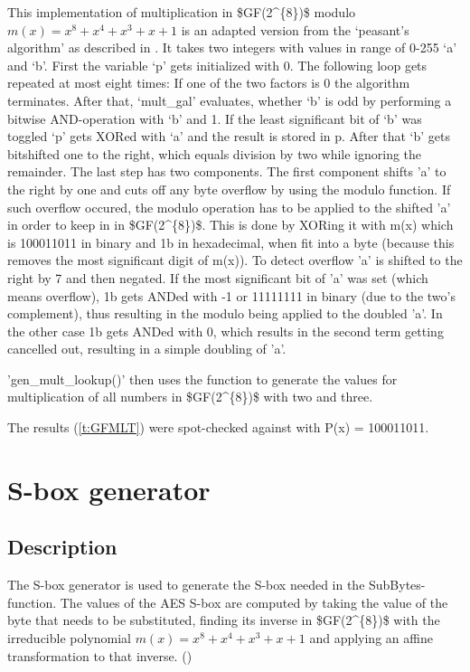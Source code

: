This implementation of multiplication in \ac{$GF(2^{8})$} modulo $m(x) = x^8 + x^4 +
x^3 + x + 1$ is an adapted version from the `peasant's algorithm' as
described in
\cite{peasants}.
It takes two integers with values in range of 0-255 `a' and `b'. First
the variable `p' gets initialized with 0. The following loop gets
repeated at most eight times: If one of the two factors is 0 the
algorithm terminates. After that, `mult\_gal' evaluates, whether `b' is
odd by performing a bitwise \ac{AND}-operation with `b' and 1. If the least
significant bit of `b' was toggled `p' gets \ac{XOR}ed with `a' and the
result is stored in p. After that `b' gets bitshifted one to the right,
which equals division by two while ignoring the remainder. The last step
has two components.
The first component shifts 'a' to the right by one and cuts off any byte overflow
by using the modulo function. If such overflow occured, the modulo operation has to be
applied to the shifted 'a' in order to keep in in \ac{$GF(2^{8})$}. This is done by \ac{XOR}ing it
with m(x) which is 100011011 in binary and 1b in hexadecimal, when fit into a byte (because
this removes the most significant digit of m(x)). To detect overflow 'a' is shifted to the right by 7
and then negated. If the most significant bit of 'a' was set (which means overflow), 1b gets \ac{AND}ed
with -1 or 11111111 in binary (due to the two's complement), thus resulting in the modulo being applied to the doubled 'a'. In the other case 1b gets \ac{AND}ed with 0, which results in the second term getting cancelled out, resulting in a simple doubling of 'a'.

'gen\_mult\_lookup()' then uses the function to generate the values for
multiplication of all numbers in \ac{$GF(2^{8})$} with two and three.

The results (\ref{t:GFMLT}) were spot-checked against
\cite{galcalc} with P(x) = 100011011.

\hypertarget{s-box-generator}{%
\section{S-box generator}\label{s-box-generator}}

\hypertarget{description-1}{%
\subsection{Description}\label{description-1}}

The S-box generator is used to generate the S-box needed in the
SubBytes-function.
The values of the AES S-box are computed by taking the value of the byte
that needs to be substituted, finding its inverse in \ac{$GF(2^{8})$} with the
irreducible polynomial $m(x) = x^8 + x^4 + x^3 + x + 1$ and applying an
affine transformation to that inverse. (\cite[ch 3.4.1]{rijndael})

